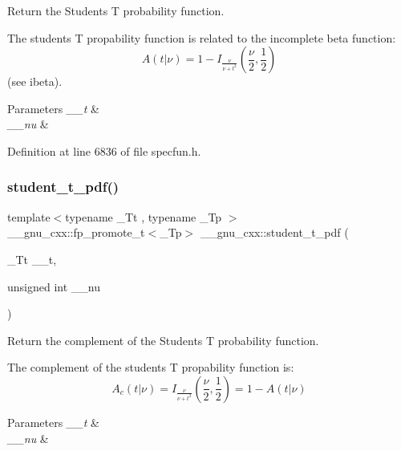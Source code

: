 Return the Students T probability function. 

The students T propability function is related to the incomplete beta function\+: \[ A(t|\nu) = 1 - I_{\frac{\nu}{\nu + t^2}}(\frac{\nu}{2}, \frac{1}{2}) \] (see ibeta).


\begin{DoxyParams}{Parameters}
{\em \+\_\+\+\_\+t} & \\
\hline
{\em \+\_\+\+\_\+nu} & \\
\hline
\end{DoxyParams}


Definition at line 6836 of file specfun.\+h.

\mbox{\label{group__mathsf__gnu_ga95a4c03cf0a8104e9a15a35acfe5fb3a}} 
\subsubsection{\texorpdfstring{student\+\_\+t\+\_\+pdf()}{student\_t\_pdf()}}
{\footnotesize\ttfamily template$<$typename \+\_\+\+Tt , typename \+\_\+\+Tp $>$ \\
\+\_\+\+\_\+gnu\+\_\+cxx\+::fp\+\_\+promote\+\_\+t$<$\+\_\+\+Tp$>$ \+\_\+\+\_\+gnu\+\_\+cxx\+::student\+\_\+t\+\_\+pdf (\begin{DoxyParamCaption}\item[{\+\_\+\+Tt}]{\+\_\+\+\_\+t,  }\item[{unsigned int}]{\+\_\+\+\_\+nu }\end{DoxyParamCaption})}



Return the complement of the Students T probability function. 

The complement of the students T propability function is\+: \[ A_c(t|\nu) = I_{\frac{\nu}{\nu + t^2}}(\frac{\nu}{2}, \frac{1}{2}) = 1 - A(t|\nu) \]


\begin{DoxyParams}{Parameters}
{\em \+\_\+\+\_\+t} & \\
\hline
{\em \+\_\+\+\_\+nu} & \\
\hline
\end{DoxyParams}


